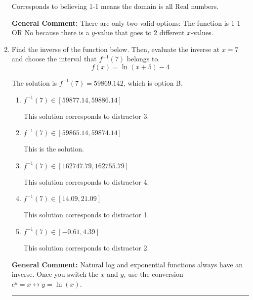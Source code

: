 \documentclass{extbook}[14pt]
\newcommand{\litem}[1]{\item #1

\rule{\textwidth}{0.4pt}}
\begin{document}
\begin{enumerate}
{\begin{enumerate}[label=\Alph*.]
Corresponds to believing 1-1 means the domain is all Real numbers.
\end{enumerate}

\textbf{General Comment:} There are only two valid options: The function is 1-1 OR No because there is a $y$-value that goes to 2 different $x$-values.
}
\litem{
Find the inverse of the function below. Then, evaluate the inverse at $x = 7$ and choose the interval that $f^{-1}(7)$ belongs to.
\[ f(x) = \ln{(x+5)}-4 \]

The solution is \( f^{-1}(7) = 59869.142 \), which is option B.\begin{enumerate}[label=\Alph*.]
\item \( f^{-1}(7) \in [59877.14, 59886.14] \)

 This solution corresponds to distractor 3.
\item \( f^{-1}(7) \in [59865.14, 59874.14] \)

 This is the solution.
\item \( f^{-1}(7) \in [162747.79, 162755.79] \)

 This solution corresponds to distractor 4.
\item \( f^{-1}(7) \in [14.09, 21.09] \)

 This solution corresponds to distractor 1.
\item \( f^{-1}(7) \in [-0.61, 4.39] \)

 This solution corresponds to distractor 2.
\end{enumerate}

\textbf{General Comment:} Natural log and exponential functions always have an inverse. Once you switch the $x$ and $y$, use the conversion $ e^y = x \leftrightarrow y=\ln(x)$.
}
\end{enumerate}
\end{document}

